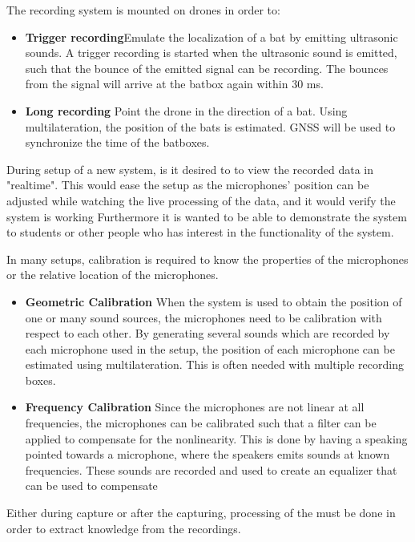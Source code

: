 The recording system is mounted on drones in order to:
\begin{itemize}
	\item \textbf{Trigger recording}Emulate the localization of a bat by emitting ultrasonic sounds. A trigger recording is started when the ultrasonic sound is emitted, such that the bounce of the emitted signal can be recording. The bounces from the signal will arrive at the batbox again within 30 ms.
	
	\item \textbf{Long recording} Point  the drone in the direction of a bat. Using multilateration, the position of the bats is estimated. GNSS will be used to synchronize the time of the batboxes. 
\end{itemize}

During setup of a new system, is it desired to to view the recorded data in "realtime". This would ease the setup as the microphones' position can be adjusted while watching the live processing of the data, and it would verify the system is working
Furthermore it is wanted to be able to demonstrate the system to students or other people who has interest in the functionality of the system.

In many setups, calibration is required to know the properties of the microphones or the relative location of the microphones.
\begin{itemize}
	\item \textbf{Geometric Calibration} When the system is used to obtain the position of one or many sound sources, the microphones need to be calibration with respect to each other. By generating several sounds which are recorded by each microphone used in the setup, the position of each microphone can be estimated using multilateration. This is often needed with multiple recording boxes.
	
	\item \textbf{Frequency Calibration} Since the microphones are not linear at all frequencies, the microphones can be calibrated such that a filter can be applied to compensate for the nonlinearity.
This is done by having a speaking pointed towards a microphone, where the speakers emits sounds at known frequencies. These sounds are recorded and used to create an equalizer that can be used to compensate

\end{itemize}

Either during capture or after the capturing, processing of the must be done in order to extract knowledge from the recordings.

